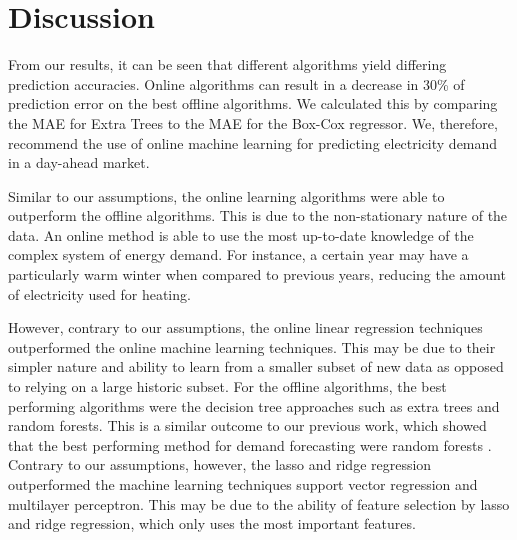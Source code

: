 \documentclass[final,3p,times,twocolumn,numbers]{elsarticle}
\begin{document}





\section{Discussion}
\label{sec:discussion}


From our results, it can be seen that different algorithms yield differing prediction accuracies. Online algorithms can result in a decrease in 30\% of prediction error on the best offline algorithms. We calculated this by comparing the MAE for Extra Trees to the MAE for the Box-Cox regressor. We, therefore, recommend the use of online machine learning for predicting electricity demand in a day-ahead market.

Similar to our assumptions, the online learning algorithms were able to outperform the offline algorithms. This is due to the non-stationary nature of the data. An online method is able to use the most up-to-date knowledge of the complex system of energy demand. For instance, a certain year may have a particularly warm winter when compared to previous years, reducing the amount of electricity used for heating.

However, contrary to our assumptions, the online linear regression techniques outperformed the online machine learning techniques. This may be due to their simpler nature and ability to learn from a smaller subset of new data as opposed to relying on a large historic subset. For the offline algorithms, the best performing algorithms were the decision tree approaches such as extra trees and random forests. This is a similar outcome to our previous work, which showed that the best performing method for demand forecasting were random forests \cite{Kell2018}. Contrary to our assumptions, however, the lasso and ridge regression outperformed the machine learning techniques support vector regression and multilayer perceptron. This may be due to the ability of feature selection by lasso and ridge regression, which only uses the most important features.
\end{document}
